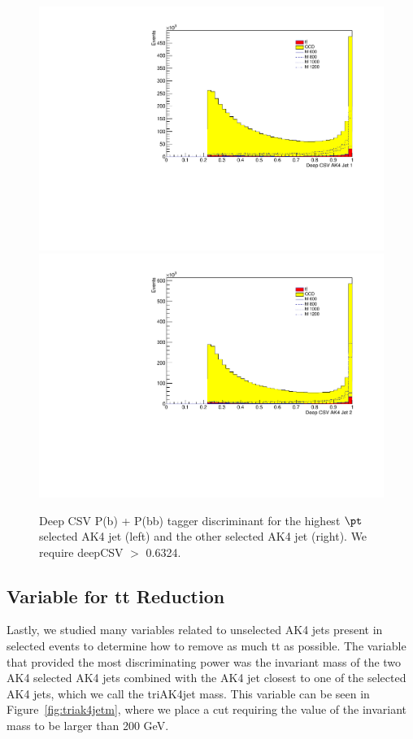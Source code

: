 \begin{figure}[h]
\begin{center}
\includegraphics[scale=0.34]{F5/shapebtag1.pdf}
\includegraphics[scale=0.34]{F5/shapebtag2.pdf}
\end{center}
\caption{Deep CSV P(b) + P(bb) tagger discriminant for the highest $\pt$ selected AK4 jet (left) and the other selected AK4 jet (right). We require deepCSV $>$ 0.6324.}
\label{fig:AK4btag}
\end{figure} 

\subsection{Variable for tt Reduction}

Lastly, we studied many variables related to unselected AK4 jets present in selected events to determine how to remove as much tt as possible. The variable that provided the most discriminating power was the invariant mass of the two AK4 selected AK4 jets combined with the AK4 jet closest to one of the selected AK4 jets, which we call the triAK4jet mass. This variable can be seen in Figure~\ref{fig:triak4jetm}, where we place a cut requiring the value of the invariant mass to be larger than 200 GeV. 

